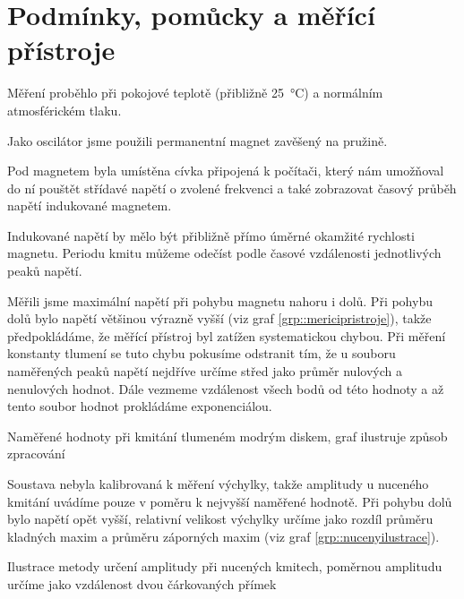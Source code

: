 \section*{Podmínky, pomůcky a měřící přístroje}
Měření proběhlo při pokojové teplotě (přibližně \SI{25}{\degreeCelsius}) a normálním atmosférickém tlaku.

Jako oscilátor jsme použili permanentní magnet zavěšený na pružině.


Pod magnetem byla umístěna cívka připojená k počítači, který nám umožňoval do ní pouštět střídavé napětí o zvolené frekvenci a také zobrazovat časový průběh napětí indukované magnetem.


Indukované napětí by mělo být přibližně přímo úměrné okamžité rychlosti magnetu.
Periodu kmitu můžeme odečíst podle časové vzdálenosti jednotlivých peaků napětí.


Měřili jsme maximální napětí při pohybu magnetu nahoru i dolů.
Při pohybu dolů bylo napětí většinou výrazně vyšší (viz graf \ref{grp::mericipristroje}), takže předpokládáme, že měřící přístroj byl zatížen systematickou chybou.
Při měření konstanty tlumení se tuto chybu pokusíme odstranit tím, že u souboru naměřených peaků napětí nejdříve určíme střed jako průměr nulových a nenulových hodnot.
Dále vezmeme vzdálenost všech bodů od této hodnoty a až 
tento soubor hodnot prokládáme exponenciálou.

\begin{graph}[htbp] 
\centering

\caption{Naměřené hodnoty při kmitání tlumeném modrým diskem, graf ilustruje způsob zpracování}
\label{grp::mericipristroje}
\end{graph}

Soustava nebyla kalibrovaná k měření výchylky, takže amplitudy u nuceného kmitání uvádíme pouze v poměru k nejvyšší naměřené hodnotě.
Při pohybu dolů bylo napětí opět vyšší, relativní velikost výchylky určíme jako rozdíl průměru kladných maxim a průměru záporných maxim (viz graf \ref{grp::nucenyilustrace}).

\begin{graph}[htbp] 
\centering

\caption{Ilustrace metody určení amplitudy při nucených kmitech, poměrnou amplitudu určíme jako vzdálenost dvou čárkovaných přímek}
\label{grp::nucenyilustrace}
\end{graph}